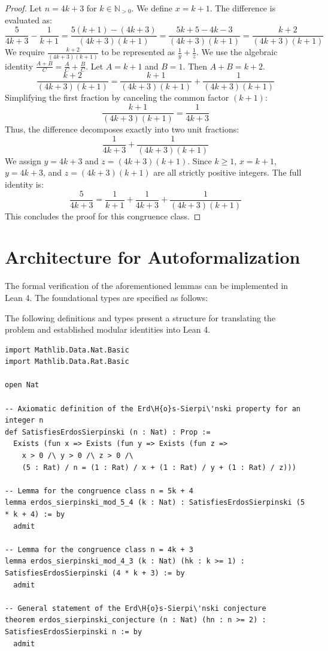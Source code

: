\documentclass[12pt, a4paper]{article}
\begin{document}
\begin{proof}
Let $n = 4k + 3$ for $k \in \mathbb{N}_{>0}$.
We define $x = k+1$.
The difference is evaluated as:
\[ \frac{5}{4k+3} - \frac{1}{k+1} = \frac{5(k+1) - (4k+3)}{(4k+3)(k+1)} = \frac{5k+5-4k-3}{(4k+3)(k+1)} = \frac{k+2}{(4k+3)(k+1)} \]
We require $\frac{k+2}{(4k+3)(k+1)}$ to be represented as $\frac{1}{y} + \frac{1}{z}$.
We use the algebraic identity $\frac{A+B}{C} = \frac{A}{C} + \frac{B}{C}$. Let $A = k+1$ and $B = 1$. Then $A+B = k+2$.
\[ \frac{k+2}{(4k+3)(k+1)} = \frac{k+1}{(4k+3)(k+1)} + \frac{1}{(4k+3)(k+1)} \]
Simplifying the first fraction by canceling the common factor $(k+1)$:
\[ \frac{k+1}{(4k+3)(k+1)} = \frac{1}{4k+3} \]
Thus, the difference decomposes exactly into two unit fractions:
\[ \frac{1}{4k+3} + \frac{1}{(4k+3)(k+1)} \]
We assign $y = 4k+3$ and $z = (4k+3)(k+1)$. Since $k \ge 1$, $x=k+1$, $y=4k+3$, and $z=(4k+3)(k+1)$ are all strictly positive integers.
The full identity is:
\[ \frac{5}{4k+3} = \frac{1}{k+1} + \frac{1}{4k+3} + \frac{1}{(4k+3)(k+1)} \]
This concludes the proof for this congruence class.
\end{proof}

\section{Architecture for Autoformalization}
The formal verification of the aforementioned lemmas can be implemented in Lean 4. The foundational types are specified as follows:

The following definitions and types present a structure for translating the problem and established modular identities into Lean 4.

\begin{lstlisting}[language=lean, basicstyle=\ttfamily\small, breaklines=true]
import Mathlib.Data.Nat.Basic
import Mathlib.Data.Rat.Basic

open Nat

-- Axiomatic definition of the Erd\H{o}s-Sierpi\'nski property for an integer n
def SatisfiesErdosSierpinski (n : Nat) : Prop :=
  Exists (fun x => Exists (fun y => Exists (fun z =>
    x > 0 /\ y > 0 /\ z > 0 /\
    (5 : Rat) / n = (1 : Rat) / x + (1 : Rat) / y + (1 : Rat) / z)))

-- Lemma for the congruence class n = 5k + 4
lemma erdos_sierpinski_mod_5_4 (k : Nat) : SatisfiesErdosSierpinski (5 * k + 4) := by
  admit

-- Lemma for the congruence class n = 4k + 3
lemma erdos_sierpinski_mod_4_3 (k : Nat) (hk : k >= 1) : SatisfiesErdosSierpinski (4 * k + 3) := by
  admit

-- General statement of the Erd\H{o}s-Sierpi\'nski conjecture
theorem erdos_sierpinski_conjecture (n : Nat) (hn : n >= 2) : SatisfiesErdosSierpinski n := by
  admit
\end{lstlisting}
\end{document}

